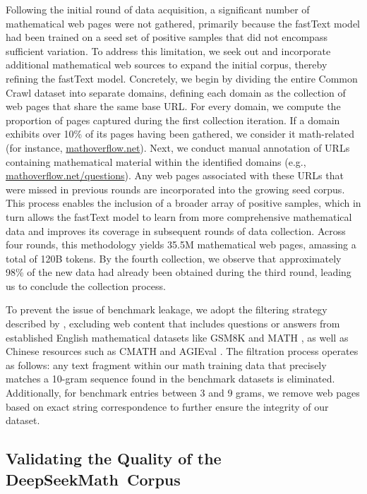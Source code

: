 \begin{itemize}[topsep=0pt]
Following the initial round of data acquisition, a significant number of mathematical web pages were not gathered, primarily because the fastText model had been trained on a seed set of positive samples that did not encompass sufficient variation. To address this limitation, we seek out and incorporate additional mathematical web sources to expand the initial corpus, thereby refining the fastText model. Concretely, we begin by dividing the entire Common Crawl dataset into separate domains, defining each domain as the collection of web pages that share the same base URL. For every domain, we compute the proportion of pages captured during the first collection iteration. If a domain exhibits over 10\% of its pages having been gathered, we consider it math-related (for instance, \url{mathoverflow.net}).
Next, we conduct manual annotation of URLs containing mathematical material within the identified domains (e.g., \url{mathoverflow.net/questions}).
Any web pages associated with these URLs that were missed in previous rounds are incorporated into the growing seed corpus. This process enables the inclusion of a broader array of positive samples, which in turn allows the fastText model to learn from more comprehensive mathematical data and improves its coverage in subsequent rounds of data collection. Across four rounds, this methodology yields 35.5M mathematical web pages, amassing a total of 120B tokens. By the fourth collection, we observe that approximately 98\% of the new data had already been obtained during the third round, leading us to conclude the collection process.

To prevent the issue of benchmark leakage, we adopt the filtering strategy described by \cite{deepseek-coder}, excluding web content that includes questions or answers from established English mathematical datasets like GSM8K \citep{gsm8k} and MATH \citep{MATH}, as well as Chinese resources such as CMATH \citep{wei2023cmath} and AGIEval \citep{agieval}. The filtration process operates as follows: any text fragment within our math training data that precisely matches a 10-gram sequence found in the benchmark datasets is eliminated. Additionally, for benchmark entries between 3 and 9 grams, we remove web pages based on exact string correspondence to further ensure the integrity of our dataset.

\subsection{Validating the Quality of the DeepSeekMath~Corpus}


\end{itemize}
